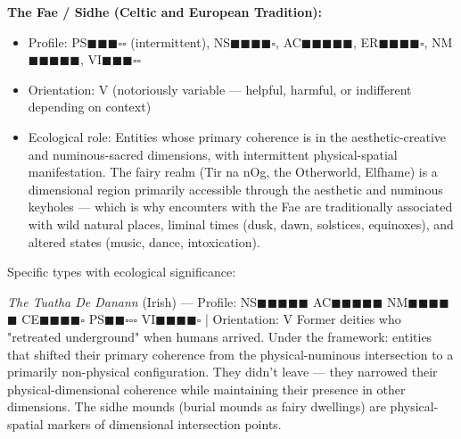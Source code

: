 \textbf{The Fae / Sidhe (Celtic and European Tradition):}

\begin{itemize}[nosep,leftmargin=*]
  \item Profile: PS$\blacksquare$$\blacksquare$$\blacksquare$$\square$$\square$ (intermittent), NS$\blacksquare$$\blacksquare$$\blacksquare$$\blacksquare$$\square$, AC$\blacksquare$$\blacksquare$$\blacksquare$$\blacksquare$$\blacksquare$, ER$\blacksquare$$\blacksquare$$\blacksquare$$\blacksquare$$\square$, NM$\blacksquare$$\blacksquare$$\blacksquare$$\blacksquare$$\blacksquare$, VI$\blacksquare$$\blacksquare$$\blacksquare$$\square$$\square$
  \item Orientation: V (notoriously variable — helpful, harmful, or indifferent depending on context)
  \item Ecological role: Entities whose primary coherence is in the aesthetic-creative and numinous-sacred dimensions, with intermittent physical-spatial manifestation. The fairy realm (Tir na nOg, the Otherworld, Elfhame) is a dimensional region primarily accessible through the aesthetic and numinous keyholes — which is why encounters with the Fae are traditionally associated with wild natural places, liminal times (dusk, dawn, solstices, equinoxes), and altered states (music, dance, intoxication).
\end{itemize}


Specific types with ecological significance:


\textit{The Tuatha De Danann} (Irish) — Profile: NS$\blacksquare$$\blacksquare$$\blacksquare$$\blacksquare$$\blacksquare$ AC$\blacksquare$$\blacksquare$$\blacksquare$$\blacksquare$$\blacksquare$ NM$\blacksquare$$\blacksquare$$\blacksquare$$\blacksquare$$\blacksquare$ CE$\blacksquare$$\blacksquare$$\blacksquare$$\blacksquare$$\square$ PS$\blacksquare$$\blacksquare$$\square$$\square$$\square$ VI$\blacksquare$$\blacksquare$$\blacksquare$$\blacksquare$$\square$ | Orientation: V Former deities who "retreated underground" when humans arrived. Under the framework: entities that shifted their primary coherence from the physical-numinous intersection to a primarily non-physical configuration. They didn't leave — they narrowed their physical-dimensional coherence while maintaining their presence in other dimensions. The sidhe mounds (burial mounds as fairy dwellings) are physical-spatial markers of dimensional intersection points.


